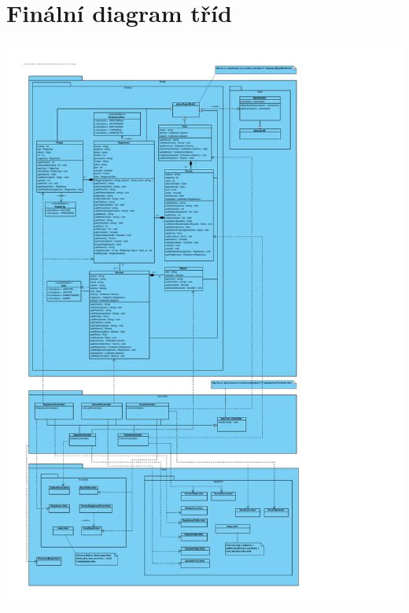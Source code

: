 \documentclass[12pt,a4paper,titlepage,final]{report}
\begin{document}
\section{Finální diagram tříd}
		
		\begin{center}
			\captionsetup{type=figure}
			\includegraphics[height=19cm]{img/architektura-detail.pdf}
		\end{center}
		
\end{document}
